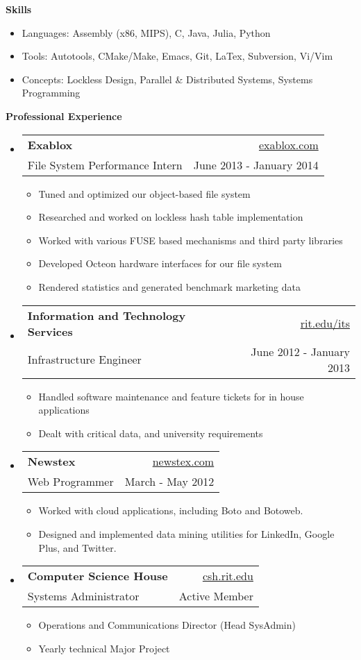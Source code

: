 \documentclass[letterpaper,11pt]{article}
\makeatletter
\newcommand{\resitem}[1]{\item #1 \vspace{-2pt}}
\newcommand{\resheading}[1]{{\large \colorbox{mygrey}{\begin{minipage}{\textwidth}{\textbf{#1 \vphantom{p\^{E}}}}\end{minipage}}}}
\newcommand{\ressubheading}[4]{
\begin{tabular*}{6.5in}{l@{\extracolsep{\fill}}r}
		\textbf{#1} & #2 \\
		{#3} & {#4} \\
\end{tabular*}\vspace{-6pt}}
\makeatother
\begin{document}
\resheading{{Skills}}
{ \footnotesize
		\begin{itemize}
			\item{Languages: Assembly (x86, MIPS), C, Java, Julia, Python}
			\item{Tools: Autotools, CMake/Make, Emacs, Git, LaTex, Subversion, Vi/Vim}
			\item{Concepts: Lockless Design, Parallel \& Distributed Systems, Systems Programming}
		\end{itemize}
}
\resheading{Professional Experience}
{\footnotesize
	\begin{itemize}
			\item
			\ressubheading{Exablox}{\href{http://www.exablox.com/}{exablox.com}}{File System Performance Intern}{June 2013 - January 2014}
			{ \footnotesize
				\begin{itemize}
					\item{Tuned and optimized our object-based file system}
					\item{Researched and worked on lockless hash table implementation}
					\item{Worked with various FUSE based mechanisms and third party libraries}
					\item{Developed Octeon hardware interfaces for our file system}
					\item{Rendered statistics and generated benchmark marketing data}
				\end{itemize}
			}
			\item 
			\ressubheading{Information and Technology Services}{\href{http://www.rit.edu/its/}{rit.edu/its}}{Infrastructure Engineer}{June 2012 - January 2013}
			{ \footnotesize
				\begin{itemize}
					\item{Handled software maintenance and feature tickets for in house applications}
					\item{Dealt with critical data, and university requirements}
				\end{itemize}
			}
		\item	
			\ressubheading{Newstex}{\href{http://www.newstex.com/}{newstex.com}}{Web Programmer}{March - May 2012} 
				{ \footnotesize 
				\begin{itemize}
					\item{Worked with cloud applications, including Boto and Botoweb.}
					\item{Designed and implemented data mining utilities for LinkedIn, Google Plus, and Twitter.}
				\end{itemize}
				}
		\item 
			\ressubheading{Computer Science House}{\href{http://www.csh.rit.edu/}{csh.rit.edu}}{Systems Administrator}{Active Member} 
			{ \footnotesize
				\begin{itemize}		
					\resitem{Operations and Communications Director (Head SysAdmin)}
					\resitem{Yearly technical Major Project}
				\end{itemize}
			}		
	\end{itemize}  %
}
\end{document}
